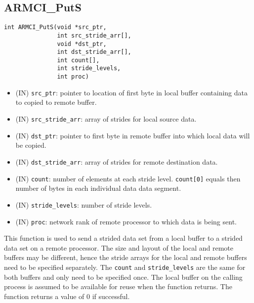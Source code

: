 \documentclass[12pt]{article}
\begin{document}
\subsection{ARMCI\_PutS}
\begin{verbatim}
int ARMCI_PutS(void *src_ptr,
               int src_stride_arr[],
               void *dst_ptr,
               int dst_stride_arr[],
               int count[],
               int stride_levels,
               int proc)
\end{verbatim}
\begin{itemize}
\item (IN) \texttt{src\_ptr}: pointer to location of first byte in local buffer
containing data to copied to remote buffer.
\item (IN) \texttt{src\_stride\_arr}: array of strides for local source data.
\item (IN) \texttt{dst\_ptr}: pointer to first byte in remote buffer into which local
data will be copied.
\item (IN) \texttt{dst\_stride\_arr}: array of strides for remote destination data.
\item (IN) \texttt{count}: number of elements at each stride level.
\texttt{count[0]} equals then number of bytes in each individual data data segment.
\item (IN) \texttt{stride\_levels}: number of stride levels.
\item (IN) \texttt{proc}: network rank of remote processor to which data is
being sent.
\end{itemize}
This function is used to send a strided data set from a local buffer to a
strided data set on a remote processor. The size and layout of the local and
remote buffers may be different, hence the stride arrays for the local and
remote buffers need to be specified separately. The \texttt{count} and
\texttt{stride\_levels} are the same for both buffers and only need to be
specified once. The local buffer on the calling process is assumed to be
available for reuse when the function returns. The function returns a value of 0
if successful.
\end{document}
